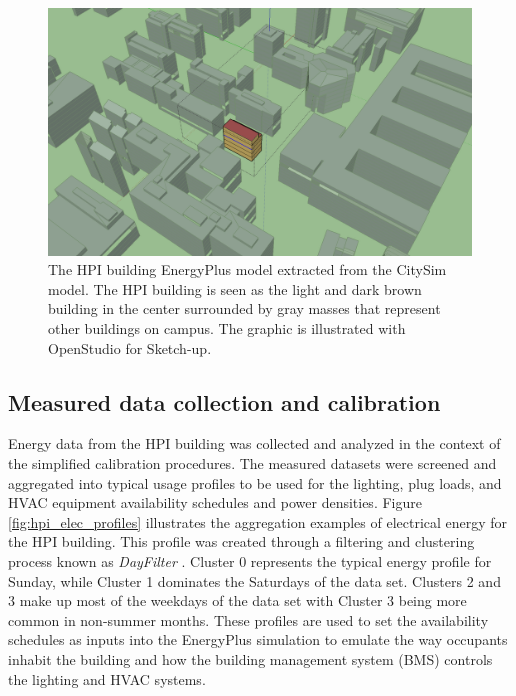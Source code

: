 \documentclass{tBPS2e}
\theoremstyle{plain}
\theoremstyle{definition}
\theoremstyle{remark}
\begin{document}
\begin{figure}[H]
\centering
\includegraphics[scale=0.2]{figures/HPI_Campus.png}
\caption{The HPI building EnergyPlus model extracted from the CitySim model. The HPI building is seen
as the light and dark brown building in the center surrounded by gray masses that represent other buildings on 
campus. The graphic is illustrated with OpenStudio for Sketch-up.}
\label{fig:HPIcampus}
\end{figure}

\subsection{Measured data collection and calibration}
Energy data from the HPI building was collected and analyzed in the context of
the simplified calibration procedures. The measured datasets were screened and
aggregated into typical usage profiles to be used for the lighting, plug loads, and HVAC equipment availability schedules and power densities. Figure
\ref{fig:hpi_elec_profiles} illustrates the aggregation examples of electrical
energy for the HPI building. This profile was created through a filtering and
clustering process known as \emph{DayFilter} \citep{miller_automated_2015}. Cluster 0 represents
the typical energy profile for Sunday, while Cluster 1 dominates the Saturdays of the data set.
Clusters 2 and 3 make up most of the weekdays of the data set with Cluster 3 being more common in 
non-summer months. These profiles are used to set the availability schedules as inputs into the
EnergyPlus simulation to emulate the way occupants inhabit the building and
how the building management system (BMS) controls the lighting and HVAC
systems. 
\end{document}
